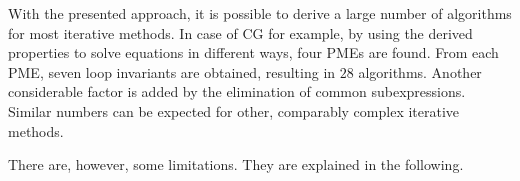 With the presented approach, it is possible to derive a large number of algorithms for most iterative methods. In case of CG for example, by using the derived properties to solve equations in different ways, four PMEs are found. From each PME, seven loop invariants are obtained, resulting in $28$ algorithms. Another considerable factor is added by the elimination of common subexpressions. Similar numbers can be expected for other, comparably complex iterative methods.
%
%
%
%

There are, however, some limitations. They are explained in the following.

